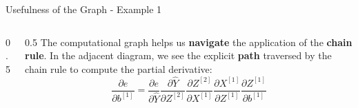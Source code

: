 \begin{frame}{Usefulness of the Graph - Example 1}
\begin{columns}
\begin{column}{0.5\textwidth}
\begin{center}
{\begin{tikzpicture}
					\end{tikzpicture}
				}
			\end{center}
		\end{column}
		\begin{column}{0.5\textwidth}
			The computational graph helps us \textbf{navigate} the application of the \textbf{chain rule}. In the adjacent diagram, we see the explicit \textbf{path} traversed by the chain rule to compute the partial derivative:
			\begin{equation*}
				\frac{\partial{e}}{\partial{b^{[1]}}} = \frac{\partial{e}}{\partial{\hat{Y}}} \frac{\partial{\hat{Y}}}{\partial{Z^{[2]}}} \frac{\partial{Z^{[2]}}}{\partial{X^{[1]}}} \frac{\partial{X^{[1]}}}{\partial{Z^{[1]}}} \frac{\partial{Z^{[1]}}}{\partial{b^{[1]}}}
			\end{equation*}
		\end{column}
	\end{columns}
\end{frame}

